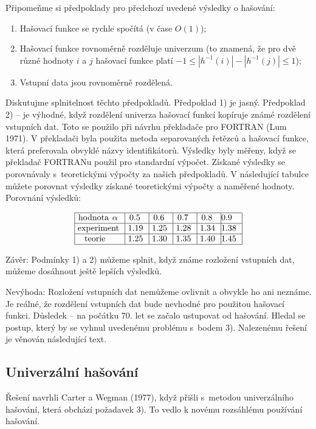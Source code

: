 \documentclass[a4paper,12pt]{article}
\begin{document}
Připomeňme si předpoklady pro předchozí uvedené 
výsledky o hašování:
\begin{enumerate}
\item
Hašovací funkce se rychle spočítá (v čase 
$O(1)$);
\item Hašovací funkce rovnoměrně rozděluje univerzum (to 
znamená, že pro dvě různé hodnoty $i$ a $j$ 
hašovací funkce platí $-1\le |h^{-1}(i)|-|h^{-1}(j)|\le 
1$); 
\item
Vstupní data jsou rovnoměrně rozdělená.
\end{enumerate}

Diskutujme splnitelnost těchto předpokladů.\newline 
Předpoklad 1) je jasný.\newline 
Předpoklad 2) -- je výhodné, 
když rozdělení univerza hašovací funkcí kopíruje známé 
rozděle\-ní vstupních dat. Toto se použilo při návrhu 
překladače pro FORTRAN (Lum 1971). V překladači byla použita metoda separovaných řetězců a hašovací funkce, 
která preferovala obvyklé názvy identifikátorů. Výsledky byly měřeny, když se překladač FORTRANu použil pro standardní výpočet. Získané výsledky se porovnávaly s~teoretickými výpočty za našich předpokladů. V 
následující tabulce můžete porovnat výsledky 
získané teoretickými výpočty a naměřené hodnoty.
Porovnání výsledků:

$$\vtop{\offinterlineskip\halign {\strut\vrule\ # & \vrule\ # & \vrule\ # & \vrule\ # & \vrule\ # & \vrule \hfil # \hfil \vrule\cr\noalign{\hrule}hodnota $\alpha$ & 0.5 & 0.6 & 0.7 & 0.8 & 0.9 \hfill \cr\noalign{\hrule}experiment & 1.19 & 1.25 & 1.28 & 1.34 & 1.38 \cr\noalign{\hrule}teorie & 1.25 & 1.30 & 1.35 & 1.40 & 1.45 \cr\noalign{\hrule}}}$$

Závěr: Podmínky 1) a 2) můžeme splnit, 
když známe rozložení vstupních dat, můžeme 
dosáhnout ještě lepších výsledků.

Nevýhoda: Rozložení vstupních dat 
nemůžeme ovlivnit a obvykle ho ani neznáme. Je 
reálné, že rozdělení vstupních dat bude nevhodné pro 
použitou hašovací funkci. Důsledek -- na počátku 
70. let se začalo ustupovat od hašování. Hledal se postup, 
který by se vyhnul uvedenému problému s~bodem 3). Nalezenému 
řešení je věnován následující text.

\subsection{Univerzální hašování}

Řešení navrhli Carter a Wegman (1977), když přišli s~metodou univerzálního hašování, která obchází poža\-davek 3).  
To vedlo k novému rozsáhlému používání hašování.  
\end{document}
